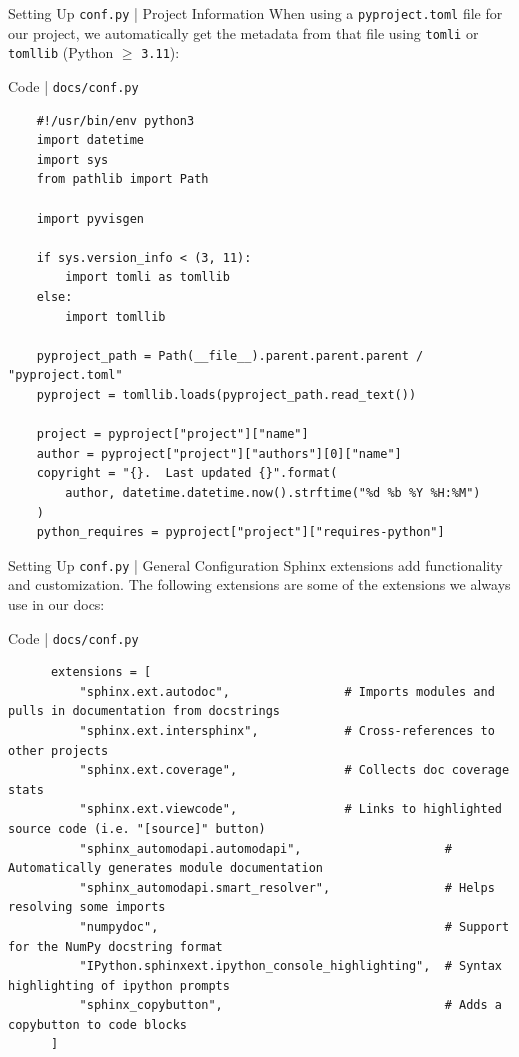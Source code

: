 \begin{frame}[fragile]{Setting Up \texttt{conf.py} | Project Information}
  When using a \texttt{pyproject.toml} file for our project, we automatically get the metadata
  from that file using \texttt{tomli} or \texttt{tomllib} (Python $\geqslant$ \texttt{3.11}):
  \begin{block}{Code | \texttt{docs/conf.py}}
  \footnotesize
  \begin{verbatim}
    #!/usr/bin/env python3
    import datetime
    import sys
    from pathlib import Path

    import pyvisgen

    if sys.version_info < (3, 11):
        import tomli as tomllib
    else:
        import tomllib

    pyproject_path = Path(__file__).parent.parent.parent / "pyproject.toml"
    pyproject = tomllib.loads(pyproject_path.read_text())

    project = pyproject["project"]["name"]
    author = pyproject["project"]["authors"][0]["name"]
    copyright = "{}.  Last updated {}".format(
        author, datetime.datetime.now().strftime("%d %b %Y %H:%M")
    )
    python_requires = pyproject["project"]["requires-python"]
  \end{verbatim}
  \end{block}
\end{frame}


\begin{frame}[fragile]{Setting Up \texttt{conf.py} | General Configuration}
  Sphinx extensions add functionality and customization. The following extensions
  are some of the extensions we always use in our docs:
  \begin{block}{Code | \texttt{docs/conf.py}}
    \footnotesize
    \begin{verbatim}
      extensions = [
          "sphinx.ext.autodoc",                # Imports modules and pulls in documentation from docstrings
          "sphinx.ext.intersphinx",            # Cross-references to other projects
          "sphinx.ext.coverage",               # Collects doc coverage stats
          "sphinx.ext.viewcode",               # Links to highlighted source code (i.e. "[source]" button)
          "sphinx_automodapi.automodapi",                    # Automatically generates module documentation
          "sphinx_automodapi.smart_resolver",                # Helps resolving some imports
          "numpydoc",                                        # Support for the NumPy docstring format
          "IPython.sphinxext.ipython_console_highlighting",  # Syntax highlighting of ipython prompts
          "sphinx_copybutton",                               # Adds a copybutton to code blocks
      ]
    \end{verbatim}
  \end{block}
\end{frame}

